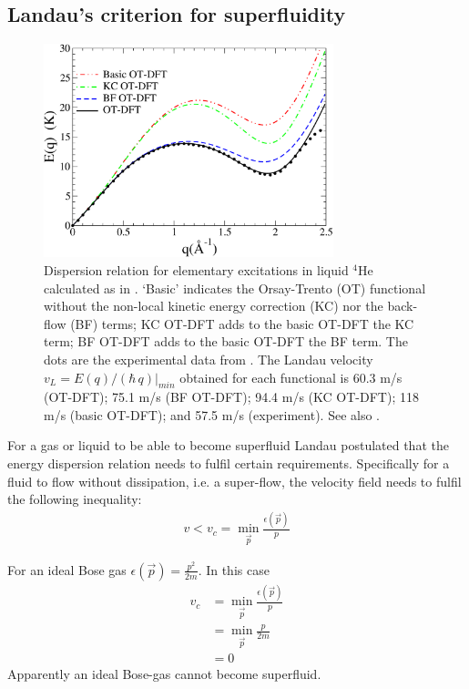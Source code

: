 		\subsection{Landau's criterion for superfluidity}
			\begin{figure}[t]
				\begin{center}
					\includegraphics[width=0.75\textwidth]{dispersion-relation}
					\caption{Dispersion relation for elementary excitations in liquid $^4$He calculated as in  \cite{Mat10a}. `Basic' indicates the Orsay-Trento (OT) functional\citep{Dalfovo1995} without the non-local kinetic energy correction (KC) nor the back-flow (BF) terms; KC OT-DFT adds to the basic OT-DFT the KC term; BF OT-DFT adds to the basic OT-DFT the BF term. The dots are the experimental data from \cite{Don81}. The Landau velocity $v_L = E(q)/(\hbar\,q)|_{min}$ obtained for each functional is 60.3 m/s (OT-DFT); 75.1 m/s (BF OT-DFT); 94.4 m/s (KC OT-DFT); 118 m/s (basic OT-DFT); and 57.5 m/s (experiment). See also .}
					\label{fig:dispersion-relation}
				\end{center}
			\end{figure}
		
			For a gas or liquid to be able to become superfluid Landau postulated that the energy dispersion relation needs to fulfil certain requirements. Specifically for a fluid to flow  without dissipation, i.e. a super-flow, the velocity field needs to fulfil the following inequality:
			\begin{align}
				v<v_c = \min_{\vec{p}}\frac{\epsilon(\vec{p})}{p}
			\end{align}
			
			For an ideal Bose gas $\epsilon(\vec{p})= \frac{p^2}{2m}$. In this case 
			\begin{align}
				v_c &= \min_{\vec{p}}\frac{\epsilon(\vec{p})}{p} \nonumber \\
					&= \min_{\vec{p}}\frac{p}{2m} \nonumber \\
					&= 0
			\end{align}
			Apparently an ideal Bose-gas cannot become superfluid.
			
